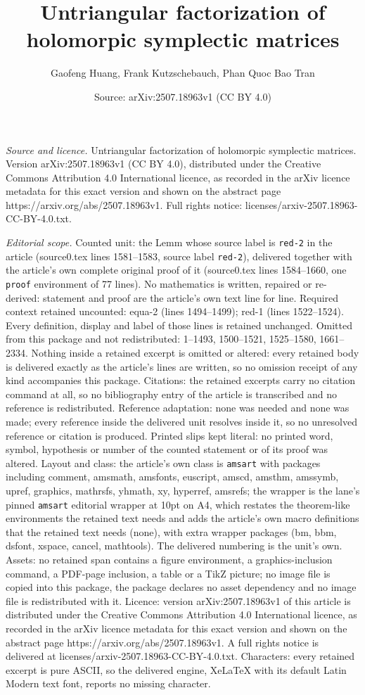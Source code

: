 \documentclass[10pt,a4paper]{amsart}
\title[Untriangular factorization of holomorpic symplectic matrices]{Untriangular factorization of holomorpic symplectic matrices}
\author{Gaofeng Huang, Frank Kutzschebauch, Phan Quoc Bao Tran}
\date{Source: arXiv:2507.18963v1 (CC BY 4.0)}
\begin{document}
\maketitle

\noindent\emph{Source and licence.} Untriangular factorization of holomorpic symplectic matrices. Version arXiv:2507.18963v1 (CC BY 4.0), distributed under the Creative Commons Attribution 4.0 International licence, as recorded in the arXiv licence metadata for this exact version and shown on the abstract page https://arxiv.org/abs/2507.18963v1. Full rights notice: licenses/arxiv-2507.18963-CC-BY-4.0.txt.\par\smallskip

\noindent\textit{Editorial scope.} Counted unit: the Lemm whose source label is \texttt{red-2} in the article (source0.tex lines 1581--1583, source label \texttt{red-2}), delivered together with the article's own complete original proof of it (source0.tex lines 1584--1660, one \texttt{proof} environment of 77 lines). No mathematics is written, repaired or re-derived: statement and proof are the article's own text line for line. Required context retained uncounted: equa-2 (lines 1494--1499); red-1 (lines 1522--1524). Every definition, display and label of those lines is retained unchanged. Omitted from this package and not redistributed: 1--1493, 1500--1521, 1525--1580, 1661--2334. Nothing inside a retained excerpt is omitted or altered: every retained body is delivered exactly as the article's lines are written, so no omission receipt of any kind accompanies this package. Citations: the retained excerpts carry no citation command at all, so no bibliography entry of the article is transcribed and no reference is redistributed. Reference adaptation: none was needed and none was made; every reference inside the delivered unit resolves inside it, so no unresolved reference or citation is produced. Printed slips kept literal: no printed word, symbol, hypothesis or number of the counted statement or of its proof was altered. Layout and class: the article's own class is \texttt{amsart} with packages including comment, amsmath, amsfonts, euscript, amscd, amsthm, amssymb, upref, graphics, mathrsfs, yhmath, xy, hyperref, amsrefs; the wrapper is the lane's pinned \texttt{amsart} editorial wrapper at 10pt on A4, which restates the theorem-like environments the retained text needs and adds the article's own macro definitions that the retained text needs (none), with extra wrapper packages (bm, bbm, dsfont, xspace, cancel, mathtools). The delivered numbering is the unit's own. Assets: no retained span contains a figure environment, a graphics-inclusion command, a PDF-page inclusion, a table or a TikZ picture; no image file is copied into this package, the package declares no asset dependency and no image file is redistributed with it. Licence: version arXiv:2507.18963v1 of this article is distributed under the Creative Commons Attribution 4.0 International licence, as recorded in the arXiv licence metadata for this exact version and shown on the abstract page https://arxiv.org/abs/2507.18963v1. A full rights notice is delivered at licenses/arxiv-2507.18963-CC-BY-4.0.txt. Characters: every retained excerpt is pure ASCII, so the delivered engine, XeLaTeX with its default Latin Modern text font, reports no missing character.
\end{document}
